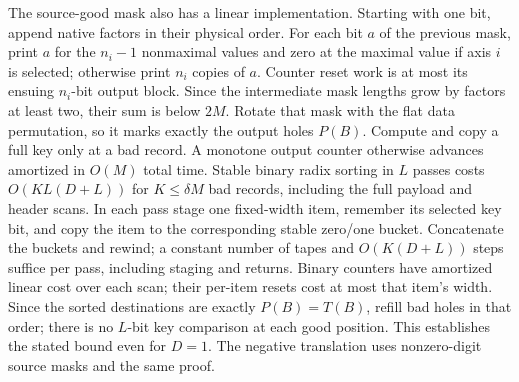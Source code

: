 \documentclass[11pt]{article}
\begin{document}
The source-good mask also has a linear implementation. Starting with
one bit, append native factors in their physical order. For each bit
$a$ of the previous mask, print $a$ for the $n_i-1$ nonmaximal values
and zero at the maximal value if axis $i$ is selected; otherwise
print $n_i$ copies of $a$. Counter reset work is at most its ensuing
$n_i$-bit output block. Since the intermediate mask lengths grow by
factors at least two, their sum is below $2M$. Rotate that mask with
the flat data permutation, so it marks exactly the output holes $P(B)$.
Compute and copy a full key only at a bad record. A monotone output
counter otherwise advances amortized in $O(M)$ total time. Stable
binary radix sorting in $L$ passes costs
$O(KL(D+L))$ for $K\le\delta M$ bad records, including the full
payload and header scans. In each pass stage one fixed-width item,
remember its selected key bit, and copy the item to the corresponding
stable zero/one bucket. Concatenate the buckets and rewind; a constant
number of tapes and $O(K(D+L))$ steps suffice per pass, including
staging and returns. Binary counters have amortized linear cost over
each scan; their per-item resets cost at most that item's width.
Since the sorted destinations are exactly
$P(B)=T(B)$, refill bad holes in that order; there is no $L$-bit key
comparison at each good position. This establishes the stated bound
even for $D=1$. The negative translation uses nonzero-digit source
masks and the same proof.
\end{document}
